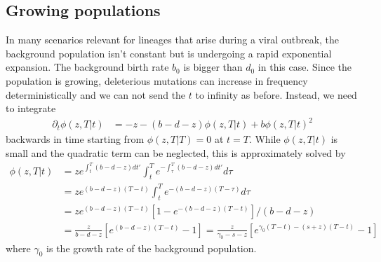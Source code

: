 \documentclass[9pt,twocolumn,twoside]{gsajnl_modified}
\begin{document}
\subsection*{Growing populations}
In many scenarios relevant for lineages that arise during a viral outbreak, the background population isn't constant but is undergoing a rapid exponential expansion.
The background birth rate $b_0$ is bigger than $d_0$ in this case.
Since the population is growing, deleterious mutations can increase in frequency deterministically and we can not send the $t$ to infinity as before.
Instead, we need to integrate
\begin{equation}
    \begin{split}
        \partial_t \phi(z,T|t) & = -z - (b-d-z) \phi(z,T|t) + b \phi(z,T|t)^2
    \end{split}
\end{equation}
backwards in time starting from $\phi(z,T|T)=0$ at $t=T$.
While $\phi(z,T|t)$ is small and the quadratic term can be neglected, this is approximately solved by
\begin{equation}
\begin{split}
    \phi(z,T|t) & = z e^{\int_t^T (b-d-z)dt'} \int_t^T e^{-\int_\tau^T (b-d-z)dt'} d\tau \\
    & = z e^{(b-d-z)(T-t)} \int_t^T e^{-(b-d-z)(T-\tau)} d\tau \\
    & = z e^{(b-d-z)(T-t)}\left[1   - e^{-(b-d-z)(T-t)}\right]/(b-d-z) \\
    & = \frac{z}{b-d-z}\left[e^{(b-d-z)(T-t)} - 1\right] = \frac{z}{\gamma_0 - s - z}\left[e^{\gamma_0 (T-t) - (s+z) (T-t)} - 1\right]
\end{split}
\end{equation}
where $\gamma_0$ is the growth rate of the background population.
\end{document}
